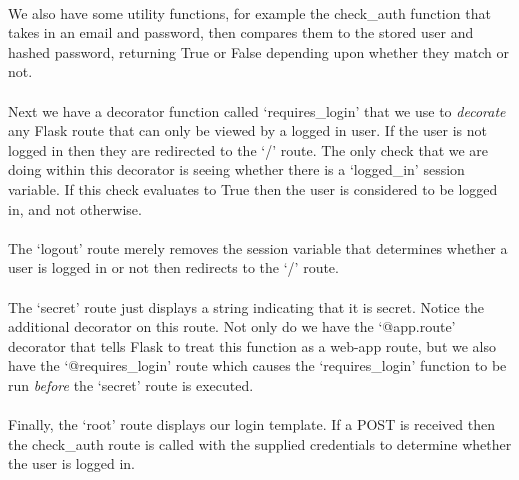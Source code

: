 \documentclass[12pt, a4paper, twoside]{book}
\begin{document}
\paragraph{} We also have some utility functions, for example the check\_auth function that takes in an email and password, then compares them to the stored user and hashed password, returning True or False depending upon whether they match or not. 
\paragraph{} Next we have a decorator function called `requires\_login' that we use to \emph{decorate} any Flask route that can only be viewed by a logged in user. If the user is not logged in then they are redirected to the `/' route. The only check that we are doing within this decorator is seeing whether there is a `logged\_in' session variable. If this check evaluates to True then the user is considered to be logged in, and not otherwise.

\paragraph{} The `logout' route merely removes the session variable that determines whether a user is logged in or not then redirects to the `/' route.

\paragraph{} The `secret' route just displays a string indicating that it is secret. Notice the additional decorator on this route. Not only do we have the `@app.route' decorator that tells Flask to treat this function as a web-app route, but we also have the `@requires\_login' route which causes the `requires\_login' function to be run \emph{before} the `secret' route is executed.

\paragraph{} Finally, the `root' route displays our login template. If a POST is received then the check\_auth route is called with the supplied credentials to determine whether the user is logged in.
\end{document}
